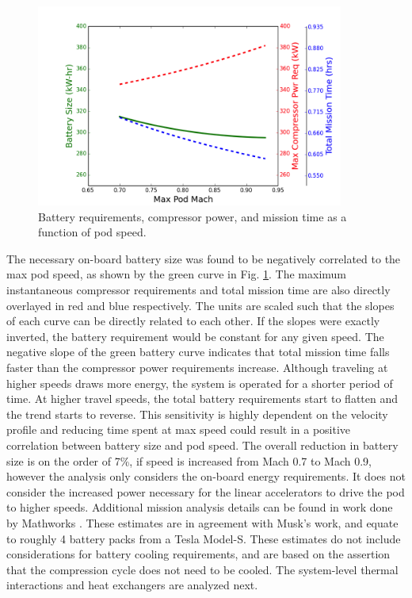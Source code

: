 \documentclass[heading.tex]{subfiles}
\begin{document}
\begin{figure}[hbtp]
\centering
\includegraphics[width=0.9\textwidth]{images/battery_plot.png}
\caption[Battery/Compressor/Mission requirements as a function of pod speed]
{Battery requirements, compressor power, and mission time as a function of pod speed.}
\label{f:battery}
\end{figure}

The necessary on-board battery size was found to be negatively correlated to the max pod speed, as shown by the green curve in Fig. \ref{f:battery}.
The maximum instantaneous compressor requirements and total mission time
are also directly overlayed in red and blue respectively. 
The units are scaled such that the slopes of each curve can be directly related to each other.
If the slopes were exactly inverted, the battery requirement would be constant for any given speed.
The negative slope of the green battery curve indicates that total mission time falls faster than the compressor power requirements increase.
Although traveling at higher speeds draws more energy, the system is operated for a shorter period of time.
At higher travel speeds, the total battery requirements start to flatten and the trend starts to reverse.
This sensitivity is highly dependent on the velocity profile
and reducing time spent at max speed could result in a positive correlation between battery size and pod speed.
The overall reduction in battery size is on the order of 7\%, if speed is increased from Mach 0.7 to Mach 0.9, 
however the analysis only considers the on-board energy requirements. It does not consider the increased power
necessary for the linear accelerators to drive the pod to higher speeds. 
Additional mission analysis details can be found in work done by Mathworks \cite{Rouleau}.
These estimates are in agreement with Musk's work, and equate to roughly 4 battery packs from a Tesla Model-S.
These estimates do not include considerations for battery cooling requirements,
and are based on the assertion that the compression cycle does not need to be cooled.
The system-level thermal interactions and heat exchangers are analyzed next.
\end{document}
